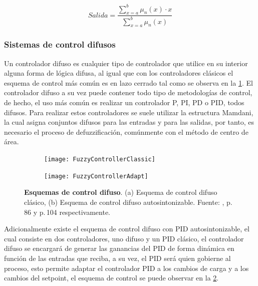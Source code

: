 				\begin{equation}\label{eq:Centroide}
					Salida = \frac{\displaystyle\sum\limits_{x=a}^{b}\mu_{n}(x)\cdot x}{\displaystyle\sum\limits_{x=a}^{b}\mu_{n}(x)}
				\end{equation}
	
		\subsubsection{Sistemas de control difusos}
			
			Un controlador difuso es cualquier tipo de controlador que utilice en su interior alguna forma de lógica difusa, al igual que con los controladores clásicos el esquema de control más común es en lazo cerrado tal como se observa en la \cref{fig:fuzzycontrollerclassic}. El controlador difuso a su vez puede contener todo tipo de metodologías de control, de hecho, el uso más común es realizar un controlador P, PI, PD o PID, todos difusos. Para realizar estos controladores se suele utilizar la estructura Mamdani, la cual asigna conjuntos difusos para las entradas y para las salidas, por tanto, es necesario el proceso de defuzzificación, comúnmente con el método de centro de área.
					
			\begin{figure}[htb]
				\centering
				\begin{subfigure}[t]{0.8\textwidth}
					\centering
					\texttt{[image: FuzzyControllerClassic]} %
					\caption{} 
					\label{fig:fuzzycontrollerclassic}
				\end{subfigure}
				\hfill
				\begin{subfigure}[t]{0.8\textwidth}
					\centering
					\texttt{[image: FuzzyControllerAdapt]} %
					\caption{}
					\label{fig:fuzzycontrolleradapt}
				\end{subfigure}
				
				\caption[Esquemas de control difuso]{\textbf{Esquemas de control difuso}. (a) Esquema de control difuso clásico, (b) Esquema de control difuso autosintonizable. Fuente: \textcite{cruz2010inteligencia}, p.$\,$86 y p.$\,$104 respectivamente. \label{fig:FuzzySchems}}
			\end{figure}
			
			Adicionalmente existe el esquema de control difuso con PID autosintonizable, el cual consiste en dos controladores, uno difuso y un PID clásico, el controlador difuso se encargará de generar las ganancias del PID de forma dinámica en función de las entradas que reciba, a su vez, el PID será quien gobierne al proceso, esto permite adaptar el controlador PID a los cambios de carga y a los cambios del setpoint, el esquema de control se puede observar en la \cref{fig:fuzzycontrolleradapt}.

